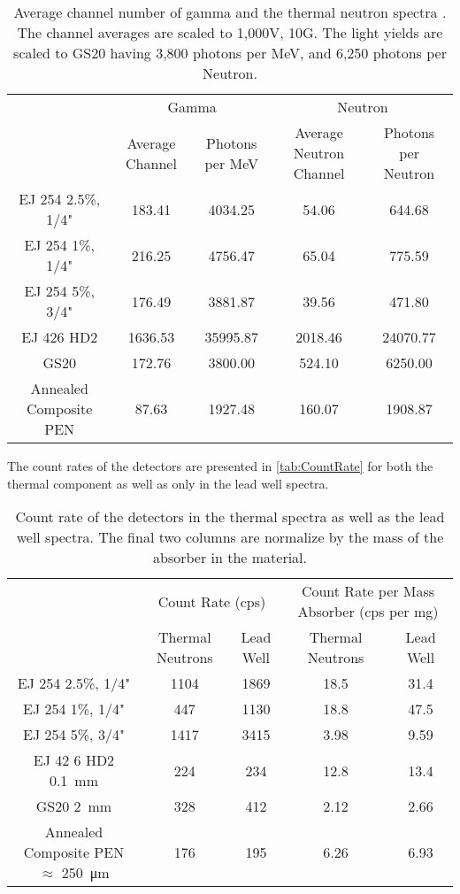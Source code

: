 \documentclass[draftcls,onecolumn]{IEEEtran}
\begin{document}
\begin{table}
  \centering
  \caption[Average Channel Number of Gamma and Neutron Spectra]{Average channel number of gamma and the thermal neutron spectra .  The channel averages are scaled to 1,000V, 10G. The light yields are scaled to GS20 having 3,800 photons per MeV, and 6,250 photons per Neutron.}
  \label{tab:AvgChNG}
  \begin{tabular}{c| c c |c c}
    \toprule
        &\multicolumn{2}{|c|}{Gamma}&\multicolumn{2}{|c}{Neutron}\\
        & Average Channel& Photons per MeV & Average Neutron Channel & Photons per Neutron\\
    \midrule
    EJ 254 2.5\%, 1/4"&	183.41	&	4034.25	&	54.06	&	644.68	\\
    EJ 254 1\%, 1/4"&	216.25	&	4756.47	&	65.04	&	775.59	\\
    EJ 254 5\%, 3/4"&	176.49	&	3881.87	&	39.56	&	471.80	\\
    EJ 426 HD2&	1636.53	&	35995.87	&	2018.46	&	24070.77	\\
    GS20 &	172.76	&	3800.00	&	524.10	&	6250.00	\\
    Annealed Composite PEN&	87.63	&	1927.48	&	160.07	&	1908.87	\\
    \bottomrule
  \end{tabular}
\end{table}
The count rates of the detectors are presented in \autoref{tab:CountRate} for both the thermal component as well as only in the lead well spectra.
\begin{table}
\centering
  \caption[Detector Count Rate]{Count rate of the detectors in the thermal spectra as well as the lead well spectra.  The final two columns are normalize by the mass of the absorber in the material.}
  \label{tab:CountRate}
  \begin{tabular}{c | c c| c c}
  \toprule
    &\multicolumn{2}{|c|}{Count Rate (cps)}&\multicolumn{2}{|c}{Count Rate per Mass Absorber (cps per mg)} \\
    & Thermal Neutrons &Lead Well & Thermal Neutrons & Lead Well\\
  \midrule
  EJ 254 2.5\%, 1/4"&	1104	&	1869	&	18.5	&	31.4	\\
  EJ 254 1\%, 1/4"&	447	&	1130	&	18.8	&	47.5	\\
  EJ 254 5\%, 3/4"&	1417	&	3415	&	3.98	&	9.59	\\
  EJ 42 6 HD2 \SI{0.1}{\mm}&	224	&	234	&	12.8	&	13.4	\\
  GS20 \SI{2}{\mm}&	328	&	412	&	2.12	&	2.66	\\
  Annealed Composite PEN $\approx$ \SI{250}{\um}&	176	&	195	&	6.26	&	6.93	\\
  \bottomrule
  \end{tabular}
\end{table}
\end{document}
